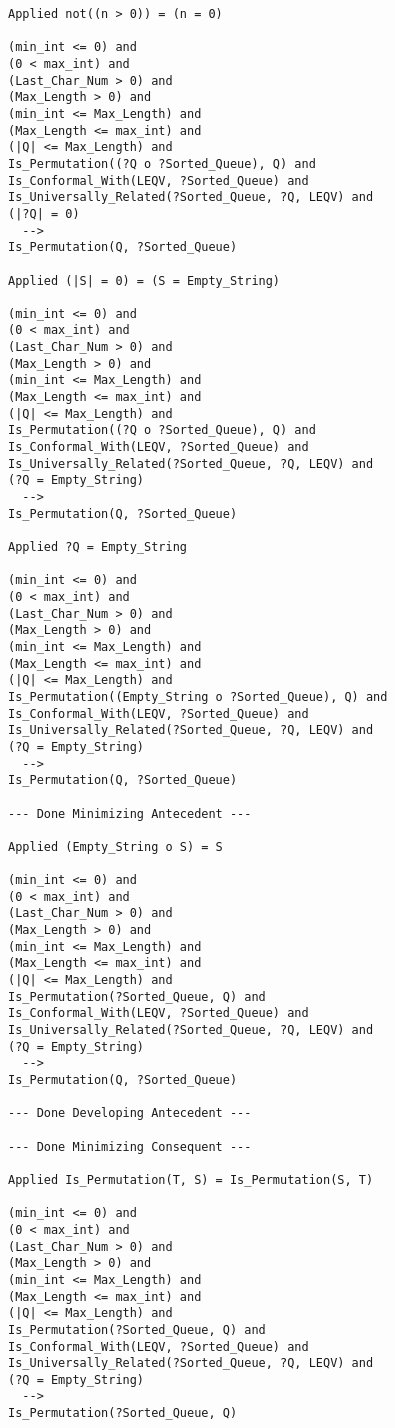 \begin{lstlisting}[language=resolve]
Applied not((n > 0)) = (n = 0)

(min_int <= 0) and
(0 < max_int) and
(Last_Char_Num > 0) and
(Max_Length > 0) and
(min_int <= Max_Length) and
(Max_Length <= max_int) and
(|Q| <= Max_Length) and
Is_Permutation((?Q o ?Sorted_Queue), Q) and
Is_Conformal_With(LEQV, ?Sorted_Queue) and
Is_Universally_Related(?Sorted_Queue, ?Q, LEQV) and
(|?Q| = 0)
  -->
Is_Permutation(Q, ?Sorted_Queue)

Applied (|S| = 0) = (S = Empty_String)

(min_int <= 0) and
(0 < max_int) and
(Last_Char_Num > 0) and
(Max_Length > 0) and
(min_int <= Max_Length) and
(Max_Length <= max_int) and
(|Q| <= Max_Length) and
Is_Permutation((?Q o ?Sorted_Queue), Q) and
Is_Conformal_With(LEQV, ?Sorted_Queue) and
Is_Universally_Related(?Sorted_Queue, ?Q, LEQV) and
(?Q = Empty_String)
  -->
Is_Permutation(Q, ?Sorted_Queue)

Applied ?Q = Empty_String

(min_int <= 0) and
(0 < max_int) and
(Last_Char_Num > 0) and
(Max_Length > 0) and
(min_int <= Max_Length) and
(Max_Length <= max_int) and
(|Q| <= Max_Length) and
Is_Permutation((Empty_String o ?Sorted_Queue), Q) and
Is_Conformal_With(LEQV, ?Sorted_Queue) and
Is_Universally_Related(?Sorted_Queue, ?Q, LEQV) and
(?Q = Empty_String)
  -->
Is_Permutation(Q, ?Sorted_Queue)

--- Done Minimizing Antecedent ---

Applied (Empty_String o S) = S

(min_int <= 0) and
(0 < max_int) and
(Last_Char_Num > 0) and
(Max_Length > 0) and
(min_int <= Max_Length) and
(Max_Length <= max_int) and
(|Q| <= Max_Length) and
Is_Permutation(?Sorted_Queue, Q) and
Is_Conformal_With(LEQV, ?Sorted_Queue) and
Is_Universally_Related(?Sorted_Queue, ?Q, LEQV) and
(?Q = Empty_String)
  -->
Is_Permutation(Q, ?Sorted_Queue)

--- Done Developing Antecedent ---

--- Done Minimizing Consequent ---

Applied Is_Permutation(T, S) = Is_Permutation(S, T)

(min_int <= 0) and
(0 < max_int) and
(Last_Char_Num > 0) and
(Max_Length > 0) and
(min_int <= Max_Length) and
(Max_Length <= max_int) and
(|Q| <= Max_Length) and
Is_Permutation(?Sorted_Queue, Q) and
Is_Conformal_With(LEQV, ?Sorted_Queue) and
Is_Universally_Related(?Sorted_Queue, ?Q, LEQV) and
(?Q = Empty_String)
  -->
Is_Permutation(?Sorted_Queue, Q)


\end{lstlisting}

